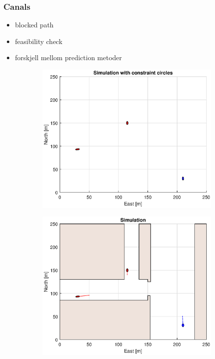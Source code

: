 \subsubsection{Canals}
\begin{itemize}
    \item blocked path
    \item feasibility check
    \item forskjell mellom prediction metoder
\end{itemize}


\clearpage
\begin{figure}[!b] %
    \begin{subfigure}[b]{0.49\textwidth}
        \centering
        \includegraphics[width=\textwidth]{Images/Figures/Havn1/Simple0_f1_Frame1}
    \end{subfigure}
    \hfill
    \begin{subfigure}[b]{0.499\textwidth}
        \centering
        \includegraphics[width=\textwidth]{Images/Figures/Havn1/Simple0_f600_Frame1}

\end{subfigure}
\end{figure}
